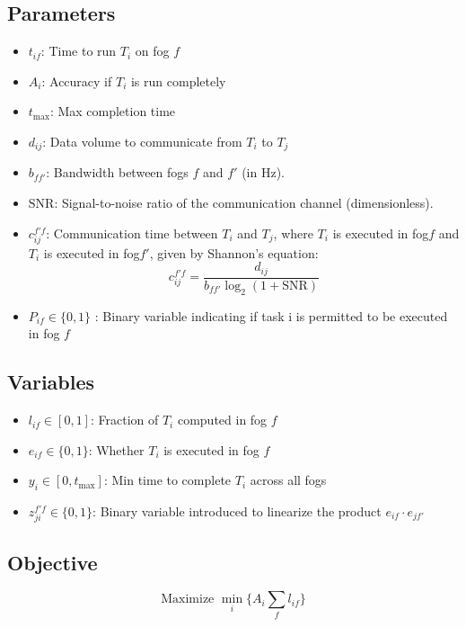 \documentclass{article}
\begin{document}
\subsection*{Parameters}
\begin{itemize}
    \item $t_{if}$: Time to run $T_i$ on fog $f$
    \item $A_i$: Accuracy if $T_i$ is run completely
    \item $t_{\max}$: Max completion time
    \item $d_{ij}$: Data volume to communicate from $T_i$ to $T_j$
    \item \( b_{ff'} \): Bandwidth between fogs \( f \) and \( f' \) (in Hz).
    \item \( \text{SNR} \): Signal-to-noise ratio of the communication channel (dimensionless).
    \item \( c_{ij}^{f'f} \): Communication time between \( T_i \) and \( T_j \), where \(T_i\) is executed in fog\( f \) and \(T_i\) is executed in fog\( f' \), given by Shannon's equation: 
    \[
    c_{ij}^{f'f} = \frac{d_{ij}}{b_{ff'} \log_2(1 + \text{SNR})}
    \]
    \item $P_{if} \in \{0,1\}$ : Binary variable indicating if task i is permitted to be executed in fog $f$
\end{itemize}
\subsection*{Variables}
\begin{itemize}
    \item $l_{if} \in [0,1]$: Fraction of $T_{i}$ computed in fog $f$
    \item $e_{if} \in \{0,1\}$: Whether $T_{i}$ is executed in fog $f$
    \item $y_{i} \in [0,t_{\max}]$: Min time to complete $T_i$ across all fogs
    \item $z_{ji}^{f'f}\in \{0,1\}$: Binary variable introduced to linearize the product \( e_{if} \cdot e_{jf'} \)
    
\end{itemize}
\subsection*{Objective}
\begin{equation}
    \text{Maximize } \min_i \{A_i \sum_f l_{if} \} \label{eq:obj}
\end{equation}
\end{document}
